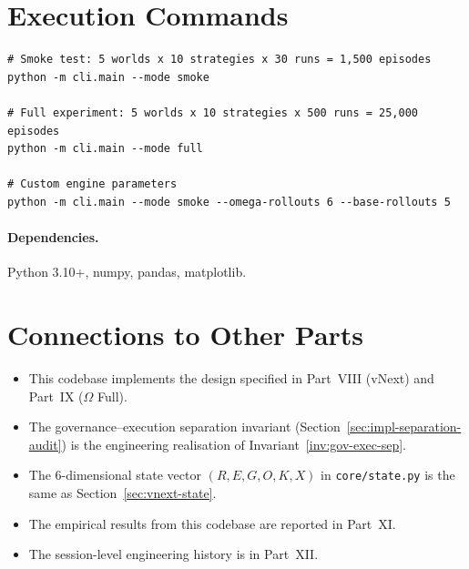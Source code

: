 \section{Execution Commands}
\label{sec:impl-execution}

\begin{lstlisting}[basicstyle=\ttfamily\small,frame=single]
# Smoke test: 5 worlds x 10 strategies x 30 runs = 1,500 episodes
python -m cli.main --mode smoke

# Full experiment: 5 worlds x 10 strategies x 500 runs = 25,000 episodes
python -m cli.main --mode full

# Custom engine parameters
python -m cli.main --mode smoke --omega-rollouts 6 --base-rollouts 5
\end{lstlisting}

\paragraph{Dependencies.}
Python 3.10+, numpy, pandas, matplotlib.

\section*{Connections to Other Parts}

\begin{itemize}
\item This codebase implements the design specified in Part~VIII
(vNext) and Part~IX ($\Omega$ Full).
\item The governance--execution separation invariant
(Section~\ref{sec:impl-separation-audit}) is the engineering
realisation of Invariant~\ref{inv:gov-exec-sep}.
\item The 6-dimensional state vector $(R, E, G, O, K, X)$ in
\texttt{core/state.py} is the same as Section~\ref{sec:vnext-state}.
\item The empirical results from this codebase are reported in
Part~XI.
\item The session-level engineering history is in Part~XII.
\end{itemize}

